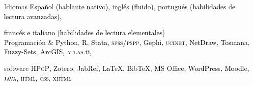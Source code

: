 





\begin{cvskills}

\cvskill
{Idiomas} 
{\textcolor{black}{Español (hablante nativo), inglés (fluido), portugués (habilidades de lectura avanzadas),}} 

\cvskill
{} 
{\textcolor{black}{francés e italiano (habilidades de lectura elementales)}} \\

\cvskill
{Programación \&} 
{\textcolor{black}{Python, R, Stata, {\scshape spss/pspp}, Gephi, {\scshape ucinet}, NetDraw, Tosmana, Fuzzy-Sets, ArcGIS, {\scshape atlas}.ti,}}

\cvskill
{software} 
{\textcolor{black}{{\scshape HPoP}, Zotero, JabRef, {\LaTeX}, Bib{\TeX}, MS Office, WordPress, Moodle, {\scshape java}, {\scshape html}, {\scshape css}, {\scshape xhtml}}} \\

\end{cvskills}
